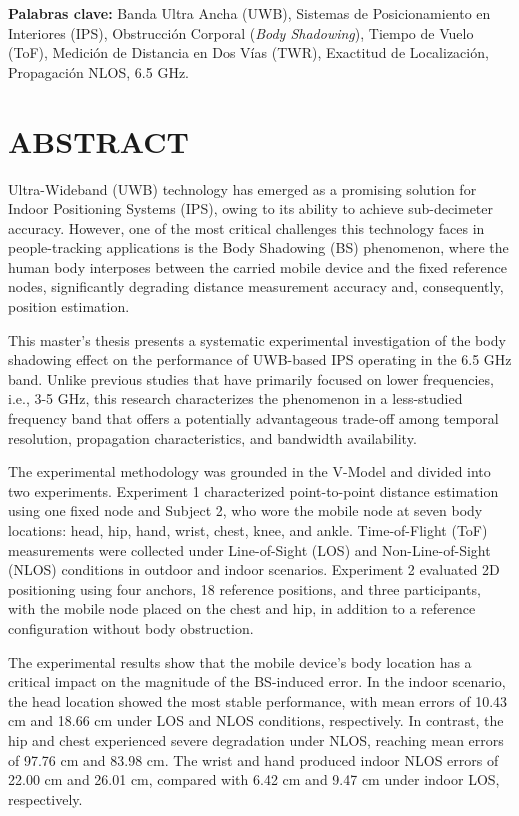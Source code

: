 \textbf{Palabras clave:} Banda Ultra Ancha (UWB), Sistemas de Posicionamiento en Interiores (IPS), Obstrucción Corporal (\textit{Body Shadowing}), Tiempo de Vuelo (ToF), Medición de Distancia en Dos Vías (TWR), Exactitud de Localización, Propagación NLOS, 6.5 GHz.


\vspace{1cm}

\chapter*{ABSTRACT}

Ultra-Wideband (UWB) technology has emerged as a promising solution for Indoor Positioning Systems (IPS), owing to its ability to achieve sub-decimeter accuracy. However, one of the most critical challenges this technology faces in people-tracking applications is the Body Shadowing (BS) phenomenon, where the human body interposes between the carried mobile device and the fixed reference nodes, significantly degrading distance measurement accuracy and, consequently, position estimation.

This master's thesis presents a systematic experimental investigation of the body shadowing effect on the performance of UWB-based IPS operating in the 6.5 GHz band. Unlike previous studies that have primarily focused on lower frequencies, i.e., 3-5 GHz, this research characterizes the phenomenon in a less-studied frequency band that offers a potentially advantageous trade-off among temporal resolution, propagation characteristics, and bandwidth availability.

The experimental methodology was grounded in the V-Model and divided into two experiments. Experiment 1 characterized point-to-point distance estimation using one fixed node and Subject 2, who wore the mobile node at seven body locations: head, hip, hand, wrist, chest, knee, and ankle. Time-of-Flight (ToF) measurements were collected under Line-of-Sight (LOS) and Non-Line-of-Sight (NLOS) conditions in outdoor and indoor scenarios. Experiment 2 evaluated 2D positioning using four anchors, 18 reference positions, and three participants, with the mobile node placed on the chest and hip, in addition to a reference configuration without body obstruction.

The experimental results show that the mobile device's body location has a critical impact on the magnitude of the BS-induced error. In the indoor scenario, the head location showed the most stable performance, with mean errors of 10.43 cm and 18.66 cm under LOS and NLOS conditions, respectively. In contrast, the hip and chest experienced severe degradation under NLOS, reaching mean errors of 97.76 cm and 83.98 cm. The wrist and hand produced indoor NLOS errors of 22.00 cm and 26.01 cm, compared with 6.42 cm and 9.47 cm under indoor LOS, respectively.

